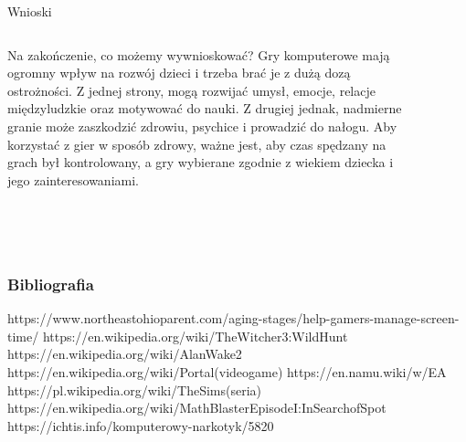 \documentclass{beamer}
\begin{document}
\begin{frame}{Wnioski} %
\begin{columns}
\begin{column}{0.5\textwidth}
Na zakończenie, co możemy wywnioskować? Gry komputerowe mają ogromny wpływ na rozwój dzieci i trzeba brać je z dużą dozą ostrożności. Z jednej strony, mogą rozwijać umysł, emocje, relacje międzyludzkie oraz motywować do nauki. Z drugiej jednak, nadmierne granie może zaszkodzić zdrowiu, psychice i prowadzić do nałogu. Aby korzystać z gier w sposób zdrowy, ważne jest, aby czas spędzany na grach był kontrolowany, a gry wybierane zgodnie z wiekiem dziecka i jego zainteresowaniami.

\end{column}
\begin{column}{0.5\textwidth}
    \begin{figure}
    \centering
        \includegraphics[width=6cm,height=5.5cm]{dziecko2.jpg}
\end{figure}
\end{column}
\end{columns}
\end{frame}

\begin{frame}%
		\frametitle{Bibliografia}
			\begin{thebibliography}{99}
			https://www.northeastohioparent.com/aging-stages/help-gamers-manage-screen-time/ 
			https://en.wikipedia.org/wiki/TheWitcher3:WildHunt 
			https://en.wikipedia.org/wiki/AlanWake2 
			https://en.wikipedia.org/wiki/Portal(videogame) 
			https://en.namu.wiki/w/EA
			https://pl.wikipedia.org/wiki/TheSims(seria) 
			https://en.wikipedia.org/wiki/MathBlasterEpisodeI:InSearchofSpot 
			https://ichtis.info/komputerowy-narkotyk/5820 
		\end{thebibliography}
	\end{frame}
\end{document}
